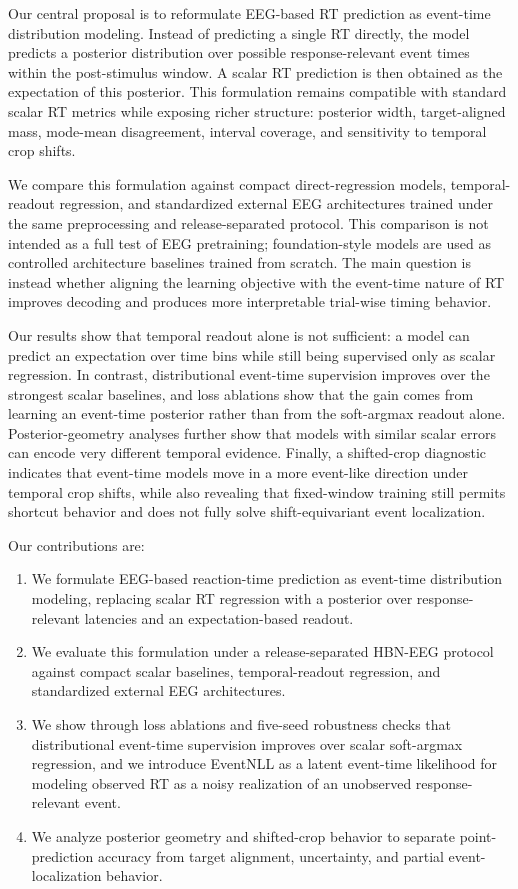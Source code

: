 \documentclass[12pt]{article}
\begin{document}
Our central proposal is to reformulate EEG-based RT prediction as event-time distribution modeling. Instead of predicting a single RT directly, the model predicts a posterior distribution over possible response-relevant event times within the post-stimulus window. A scalar RT prediction is then obtained as the expectation of this posterior. This formulation remains compatible with standard scalar RT metrics while exposing richer structure: posterior width, target-aligned mass, mode-mean disagreement, interval coverage, and sensitivity to temporal crop shifts.

We compare this formulation against compact direct-regression models, temporal-readout regression, and standardized external EEG architectures trained under the same preprocessing and release-separated protocol. This comparison is not intended as a full test of EEG pretraining; foundation-style models are used as controlled architecture baselines trained from scratch. The main question is instead whether aligning the learning objective with the event-time nature of RT improves decoding and produces more interpretable trial-wise timing behavior.

Our results show that temporal readout alone is not sufficient: a model can predict an expectation over time bins while still being supervised only as scalar regression. In contrast, distributional event-time supervision improves over the strongest scalar baselines, and loss ablations show that the gain comes from learning an event-time posterior rather than from the soft-argmax readout alone. Posterior-geometry analyses further show that models with similar scalar errors can encode very different temporal evidence. Finally, a shifted-crop diagnostic indicates that event-time models move in a more event-like direction under temporal crop shifts, while also revealing that fixed-window training still permits shortcut behavior and does not fully solve shift-equivariant event localization.

Our contributions are:
\begin{enumerate}
    \item We formulate EEG-based reaction-time prediction as event-time distribution modeling, replacing scalar RT regression with a posterior over response-relevant latencies and an expectation-based readout.
    \item We evaluate this formulation under a release-separated HBN-EEG protocol against compact scalar baselines, temporal-readout regression, and standardized external EEG architectures.
    \item We show through loss ablations and five-seed robustness checks that distributional event-time supervision improves over scalar soft-argmax regression, and we introduce EventNLL as a latent event-time likelihood for modeling observed RT as a noisy realization of an unobserved response-relevant event.
    \item We analyze posterior geometry and shifted-crop behavior to separate point-prediction accuracy from target alignment, uncertainty, and partial event-localization behavior.
\end{enumerate}
\end{document}

